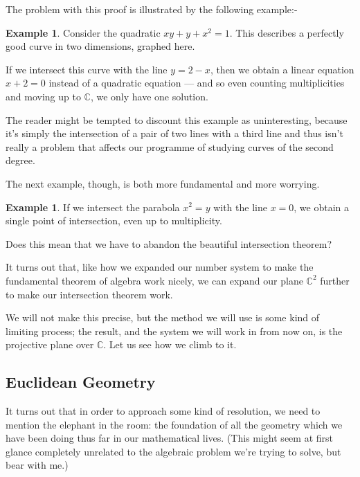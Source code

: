 \documentclass[a4paper,leqno]{article}
\numberwithin{equation}{section}
\theoremstyle{definition}
\newtheorem{ex}[equation]{Example}
\theoremstyle{remark}
\begin{document}
The problem with this proof is illustrated by the following example:-
\begin{ex}
  Consider the quadratic $ xy + y + x^2 = 1 $. This describes a perfectly good curve in two dimensions, graphed here.
  \begin{center}
  \end{center}
  If we intersect this curve with the line $ y = 2 - x $, then we obtain a linear equation $ x + 2 = 0 $ instead of a quadratic
  equation --- and so even counting multiplicities and moving up to $ \mathbb{C} $, we only have one solution.
\end{ex}

The reader might be tempted to discount this example as uninteresting, because it's simply the intersection of a pair of two lines
with a third line and thus isn't really a problem that affects our programme of studying curves of the second degree.

The next example, though, is both more fundamental and more worrying.
\begin{ex}
  If we intersect the parabola $ x^2 = y $ with the line $ x = 0 $, we obtain a single point of intersection, even
  up to multiplicity.
\end{ex}

Does this mean that we have to abandon the beautiful intersection theorem?

It turns out that, like how we expanded our number system to make the fundamental theorem of algebra work
nicely, we can expand our plane $ \mathbb{C}^2 $ further to make our intersection theorem work.

We will not make this precise, but the method we will use is some kind of limiting process; the result, and the
system we will work in from now on, is the projective plane over $ \mathbb{C} $. Let us see how we climb to it.

\subsection{Euclidean Geometry}
It turns out that in order to approach some kind of resolution, we need to mention the elephant in the room: the
foundation of all the geometry which we have been doing thus far in our mathematical lives. (This might seem at first
glance completely unrelated to the algebraic problem we're trying to solve, but bear with me.)
\end{document}
